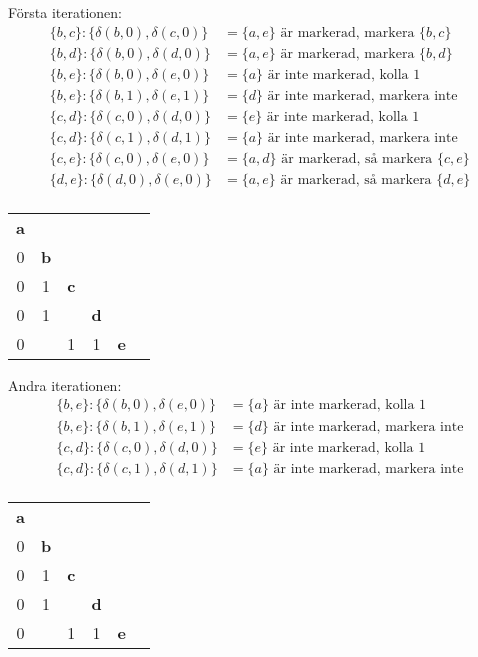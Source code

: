 \documentclass{article}
\begin{document}
Första iterationen:
\begin{align*}
    \{b, c\} : \{\delta(b, 0), \delta(c, 0)\} &= \{a, e\} \text{ är markerad, markera } \{b, c\} \\
    \{b, d\} : \{\delta(b, 0), \delta(d, 0)\} &= \{a, e\} \text{ är markerad, markera } \{b, d\} \\
    \{b, e\} : \{\delta(b, 0), \delta(e, 0)\} &= \{a\} \text{ är inte markerad, kolla 1} \\
    \{b, e\} : \{\delta(b, 1), \delta(e, 1)\} &= \{d\} \text{ är inte markerad, markera inte} \\
    \{c, d\} : \{\delta(c, 0), \delta(d, 0)\} &= \{e\} \text{ är inte markerad, kolla 1} \\
    \{c, d\} : \{\delta(c, 1), \delta(d, 1)\} &= \{a\} \text{ är inte markerad, markera inte} \\
    \{c, e\} : \{\delta(c, 0), \delta(e, 0)\} &= \{a, d\} \text{ är markerad, så markera } \{c, e\} \\
    \{d, e\} : \{\delta(d, 0), \delta(e, 0)\} &= \{a, e\} \text{ är markerad, så markera } \{d, e\} \\
\end{align*}
\begin{center}
\begin{tabular}{|*{6}{c|}}
                             \cline{1-1}
  \textbf{a}              \\ \cline{1-2}
  0 & \textbf{b}          \\ \cline{1-3}
  0 & 1 & \textbf{c}       \\ \cline{1-4}
  0 & 1 &  & \textbf{d}    \\ \cline{1-5}
  0 &   & 1 & 1 & \textbf{e} \\ \cline{1-5}
\end{tabular}
\end{center}

Andra iterationen:
\begin{align*}
    \{b, e\} : \{\delta(b, 0), \delta(e, 0)\} &= \{a\} \text{ är inte markerad, kolla 1} \\
    \{b, e\} : \{\delta(b, 1), \delta(e, 1)\} &= \{d\} \text{ är inte markerad, markera inte} \\
    \{c, d\} : \{\delta(c, 0), \delta(d, 0)\} &= \{e\} \text{ är inte markerad, kolla 1} \\
    \{c, d\} : \{\delta(c, 1), \delta(d, 1)\} &= \{a\} \text{ är inte markerad, markera inte} \\
\end{align*}
\begin{center}
\begin{tabular}{|*{6}{c|}}
                             \cline{1-1}
  \textbf{a}              \\ \cline{1-2}
  0 & \textbf{b}          \\ \cline{1-3}
  0 & 1 & \textbf{c}       \\ \cline{1-4}
  0 & 1 &  & \textbf{d}    \\ \cline{1-5}
  0 &   & 1 & 1 & \textbf{e} \\ \cline{1-5}
\end{tabular}
\end{center}
\end{document}
